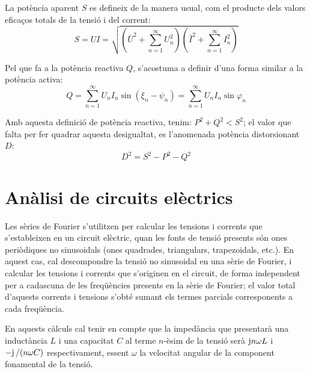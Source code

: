La potència aparent $S$ es defineix de la manera usual, com el
producte dels valors eficaços totals de la tensió i del corrent:
\begin{equation}
    S = U I = \sqrt{ \left(\bar{U}^2 + \sum_{n=1}^{\infty}U^2_n\right)
    \left(\bar{I}^2 + \sum_{n=1}^{\infty}I^2_n\right) }
\end{equation}

Pel que fa  a la potència reactiva $Q$, s'acostuma  a definir d'una
forma similar a la potència activa:
\begin{equation}
    Q = \sum_{n=1}^\infty U_n I_n
    \sin(\xi_n-\psi_n) =  \sum_{n=1}^\infty U_n I_n
    \sin \varphi_n
\end{equation}

Amb aquesta definició de potència reactiva, tenim: $P^2+Q^2 < S^2$;
el valor que falta per fer quadrar aquesta desigualtat, es l'anomenada
potència distorsionant $D$:
\begin{equation}
    D^2 = S^2 - P^2 - Q^2
\end{equation}

\section{Anàlisi de circuits elèctrics}

Les sèries de Fourier s'utilitzen per calcular les tensions i
corrents que s'estableixen en un circuit elèctric, quan les fonts de
tensió presents  són ones periòdiques no sinusoidals (ones
quadrades, triangulars, trapezoidals, etc.). En aquest cas, cal
descompondre la tensió no sinusoidal en una sèrie de Fourier, i
calcular les tensions i corrents que s'originen en el circuit, de
forma independent per a cadascuna de les freqüències presents en la
sèrie de Fourier; el valor total d'aquests corrents i tensions
s'obté sumant els termes parcials corresponents a cada freqüència.

En aquests càlculs cal tenir en compte que la impedància que
presentarà una inductància $L$ i una capacitat $C$ al terme
$n$-èsim de la tensió serà $\mathrm{j} n \omega L$ i $-\mathrm{j}\,/(n\omega C)$
respectivament, essent $\omega$ la velocitat angular de la component
fonamental de la tensió.


